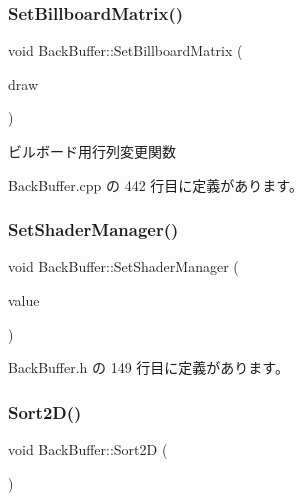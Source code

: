 \subsubsection{\texorpdfstring{Set\+Billboard\+Matrix()}{SetBillboardMatrix()}}
{\footnotesize\ttfamily void Back\+Buffer\+::\+Set\+Billboard\+Matrix (\begin{DoxyParamCaption}\item[{\mbox{\hyperlink{class_draw_base}{Draw\+Base}} $\ast$}]{draw }\end{DoxyParamCaption})\hspace{0.3cm}{\ttfamily [private]}}



ビルボード用行列変更関数 



 Back\+Buffer.\+cpp の 442 行目に定義があります。

\mbox{\label{class_back_buffer_a44566449a4df988cb1cfe5ffbb0455cc}} 
\subsubsection{\texorpdfstring{Set\+Shader\+Manager()}{SetShaderManager()}}
{\footnotesize\ttfamily void Back\+Buffer\+::\+Set\+Shader\+Manager (\begin{DoxyParamCaption}\item[{\mbox{\hyperlink{class_shader_manager}{Shader\+Manager}} $\ast$}]{value }\end{DoxyParamCaption})\hspace{0.3cm}{\ttfamily [inline]}}



 Back\+Buffer.\+h の 149 行目に定義があります。

\mbox{\label{class_back_buffer_a1530979126918a1a76b6555a5d9de9b8}} 
\subsubsection{\texorpdfstring{Sort2\+D()}{Sort2D()}}
{\footnotesize\ttfamily void Back\+Buffer\+::\+Sort2D (\begin{DoxyParamCaption}{ }\end{DoxyParamCaption})\hspace{0.3cm}{\ttfamily [private]}}




